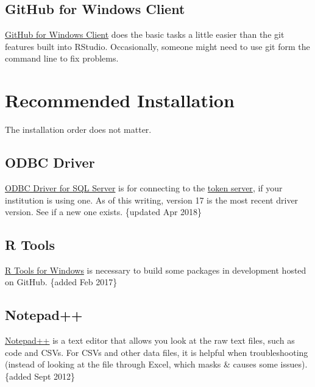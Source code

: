 \documentclass[
]{book}
\begin{document}
\hypertarget{workstation-github-client}{%
\subsection{GitHub for Windows Client}\label{workstation-github-client}}

\href{http://windows.github.com/}{GitHub for Windows Client} does the basic tasks a little easier than the git features built into RStudio. Occasionally, someone might need to use git form the command line to fix problems.

\hypertarget{workstation-recommended}{%
\section{Recommended Installation}\label{workstation-recommended}}

The installation order does not matter.

\hypertarget{workstation-odbc}{%
\subsection{ODBC Driver}\label{workstation-odbc}}

\href{https://docs.microsoft.com/en-us/sql/connect/odbc/download-odbc-driver-for-sql-server}{ODBC Driver for SQL Server} is for connecting to the \href{https://github.com/OuhscBbmc/REDCapR/blob/master/vignettes/SecurityDatabase.Rmd}{token server}, if your institution is using one. As of this writing, version 17 is the most recent driver version. See if a new one exists. \{updated Apr 2018\}

\hypertarget{workstation-rtools}{%
\subsection{R Tools}\label{workstation-rtools}}

\href{https://cran.r-project.org/bin/windows/Rtools/}{R Tools for Windows} is necessary to build some packages in development hosted on GitHub. \{added Feb 2017\}

\hypertarget{workstation-notepadpp}{%
\subsection{Notepad++}\label{workstation-notepadpp}}

\href{http://notepad-plus-plus.org/}{Notepad++} is a text editor that allows you look at the raw text files, such as code and CSVs. For CSVs and other data files, it is helpful when troubleshooting (instead of looking at the file through Excel, which masks \& causes some issues). \{added Sept 2012\}
\end{document}
